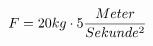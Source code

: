 \documentclass[preview]{standalone}
\begin{document}
\begin{align*}
\special{dvisvgm:raw <g id='unique000'>}F = 20kg \cdot 5 \frac{Meter}{Sekunde^{2}}\special{dvisvgm:raw </g>}
\end{align*}
\end{document}
